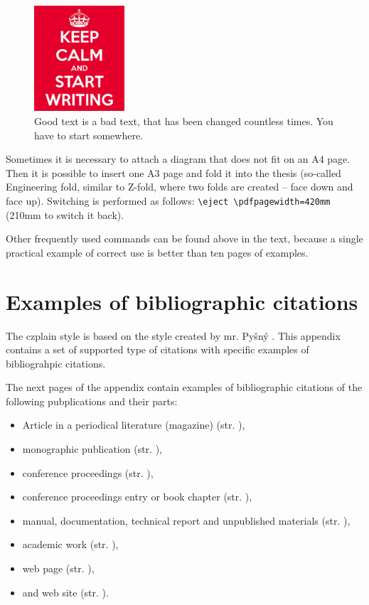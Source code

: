 \begin{figure}[hbt]
	\centering
	\includegraphics[width=0.3\textwidth]{obrazky-figures/keep-calm.png}
	\caption{Good text is a bad text, that has been changed countless times. You have to start somewhere.}
	\label{keepCalm}
\end{figure}

Sometimes it is necessary to attach a diagram that does not fit on an A4 page. Then it is possible to insert one A3 page and fold it into the thesis (so-called Engineering fold, similar to Z-fold, where two folds are created -- face down and face up). Switching is performed as follows: \texttt{\textbackslash{}eject \textbackslash{}pdfpagewidth=420mm} (210mm to switch it back).

Other frequently used commands can be found above in the text, because a single practical example of correct use is better than ten pages of examples.



\newcommand{\odradkovani}{\\[0.3em]}

\chapter{Examples of bibliographic citations}
\label{priloha-priklady-citaci}
The czplain style is based on the style created by mr. Pyšný \cite{Pysny}. This appendix contains a set of supported type of citations with specific examples of bibliograhpic citations.

The next pages of the appendix contain examples of bibliographic citations of the following pubplications and their parts:
\begin{itemize}
   \item Article in a periodical literature (magazine) (str. \pageref{pr-casopis-clanek}),
   \item monographic publication (str. \pageref{pr-monografie}),
   \item conference proceedings (str. \pageref{pr-sbornik}),
   \item conference proceedings entry or book chapter (str. \pageref{pr-kapitola}),
   \item manual, documentation, technical report and unpublished materials (str. \pageref{pr-manual}),
   \item academic work (str. \pageref{pr-thesis}),
   \item web page (str. \pageref{pr-webpage}),
   \item and web site (str. \pageref{pr-website}).
\end{itemize}

